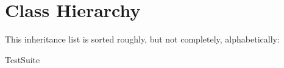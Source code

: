\section{Class Hierarchy}
This inheritance list is sorted roughly, but not completely, alphabetically\+:\begin{DoxyCompactList}
\item Test\+Suite\begin{DoxyCompactList}
\item {}
\end{DoxyCompactList}
\end{DoxyCompactList}
